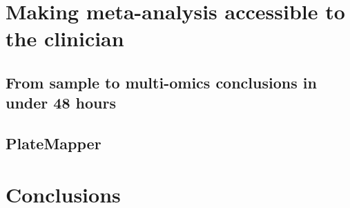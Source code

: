 \documentclass[12pt,chapterheads]{ucsd}
\begin{document}
\chapter{Making meta-analysis accessible to the clinician}\label{chapter_rapid_response}
\glsresetall
\section{From sample to multi-omics conclusions in under 48 hours}\label{section_48hours}
\section{PlateMapper}\label{section_platemapper}

\chapter{Conclusions}\label{chapter_conclusions}
\glsresetall
% 

\appendix


\printindex %


\end{document}
